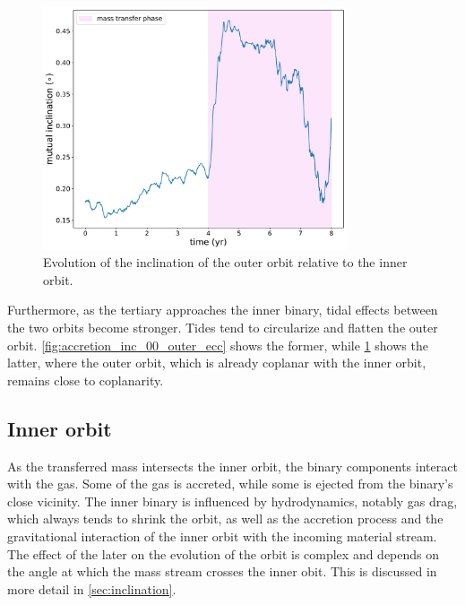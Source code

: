 \begin{figure}[H]
    \centering
    \includegraphics[width=0.8\textwidth]{Thesis/graphs/inc_00/accretion_inc_00_inc.pdf}
    \caption{Evolution of the inclination of the outer orbit relative to the inner orbit.}
    \label{fig:accretion_inc_00_inc}
\end{figure}
Furthermore, as the tertiary approaches the inner binary, tidal effects between the two orbits become stronger. Tides tend to circularize and flatten the outer orbit. \cref{fig:accretion_inc_00_outer_ecc} shows the former, while \cref{fig:accretion_inc_00_inc} shows the latter, where the outer orbit, which is already coplanar with the inner orbit, remains close to coplanarity.


\subsection{Inner orbit}

As the transferred mass intersects the inner orbit, the binary components interact with the gas. Some of the gas is accreted, while some is ejected from the binary's close vicinity. The inner binary is influenced by hydrodynamics, notably gas drag, which always tends to shrink the orbit, as well as the accretion process and the gravitational interaction of the inner orbit with the incoming material stream.  The effect of the later on the evolution of the orbit is complex and depends on the angle at which the mass stream crosses the inner obit. This is discussed in more detail in \cref{sec:inclination}. 

